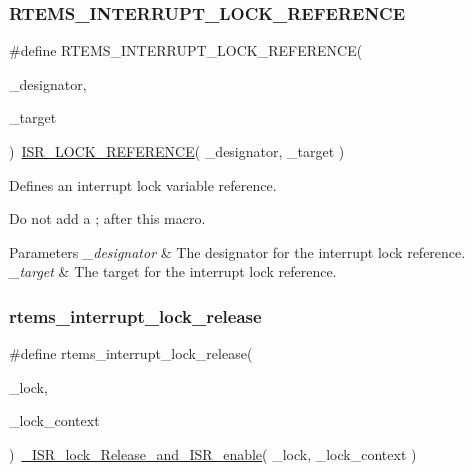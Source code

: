 \subsubsection{\texorpdfstring{RTEMS\_INTERRUPT\_LOCK\_REFERENCE}{RTEMS\_INTERRUPT\_LOCK\_REFERENCE}}
{\footnotesize\ttfamily \#define R\+T\+E\+M\+S\+\_\+\+I\+N\+T\+E\+R\+R\+U\+P\+T\+\_\+\+L\+O\+C\+K\+\_\+\+R\+E\+F\+E\+R\+E\+N\+CE(\begin{DoxyParamCaption}\item[{}]{\+\_\+designator,  }\item[{}]{\+\_\+target }\end{DoxyParamCaption})~\mbox{\hyperlink{group__RTEMSScoreISRLocks_gad41ddc507bfa7022bd9355ff252888d2}{I\+S\+R\+\_\+\+L\+O\+C\+K\+\_\+\+R\+E\+F\+E\+R\+E\+N\+CE}}( \+\_\+designator, \+\_\+target )}



Defines an interrupt lock variable reference. 

Do not add a \textquotesingle{};\textquotesingle{} after this macro.


\begin{DoxyParams}{Parameters}
{\em \+\_\+designator} & The designator for the interrupt lock reference. \\
\hline
{\em \+\_\+target} & The target for the interrupt lock reference. \\
\hline
\end{DoxyParams}
\mbox{\label{group__ClassicINTRLocks_gaefc0c78feded09af9fd5b3ed93262f97}} 
\subsubsection{\texorpdfstring{rtems\_interrupt\_lock\_release}{rtems\_interrupt\_lock\_release}}
{\footnotesize\ttfamily \#define rtems\+\_\+interrupt\+\_\+lock\+\_\+release(\begin{DoxyParamCaption}\item[{}]{\+\_\+lock,  }\item[{}]{\+\_\+lock\+\_\+context }\end{DoxyParamCaption})~\mbox{\hyperlink{group__RTEMSScoreISRLocks_ga87a2125e8bfba5f2f5b72adbeee4dcc3}{\+\_\+\+I\+S\+R\+\_\+lock\+\_\+\+Release\+\_\+and\+\_\+\+I\+S\+R\+\_\+enable}}( \+\_\+lock, \+\_\+lock\+\_\+context )}



